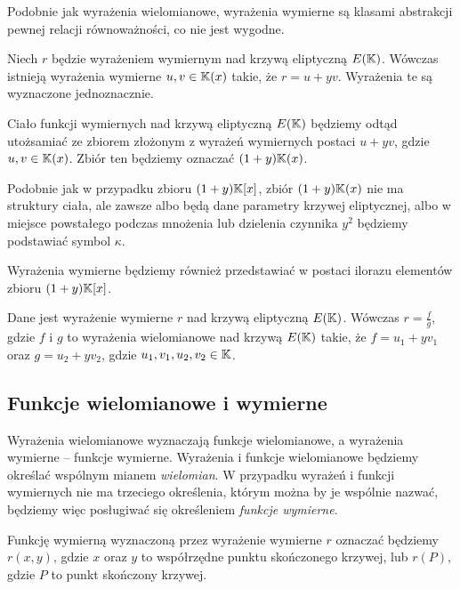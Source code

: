 Podobnie jak wyrażenia wielomianowe,
wyrażenia wymierne są klasami abstrakcji pewnej relacji równoważności,
co nie jest wygodne.

\begin{theorem}
Niech $r$ będzie wyrażeniem wymiernym nad krzywą eliptyczną $E(\mathbb{K})$.
Wówczas istnieją wyrażenia wymierne $u, v \in \mathbb{K}(x)$ takie,
że $r = u + yv$.
Wyrażenia te są wyznaczone jednoznacznie.
\end{theorem}

\begin{remark}
Ciało funkcji wymiernych nad krzywą eliptyczną $E(\mathbb{K})$
będziemy odtąd utożsamiać ze zbiorem
złożonym z wyrażeń wymiernych postaci $u + yv$,
gdzie $u,v \in \mathbb{K}(x)$.
Zbiór ten będziemy oznaczać $(1 + y)\mathbb{K}(x)$.
\end{remark}

Podobnie jak w przypadku zbioru $(1 + y)\mathbb{K}[x]$,
zbiór $(1 + y)\mathbb{K}(x)$ nie ma struktury ciała,
ale zawsze albo będą dane parametry krzywej eliptycznej,
albo w miejsce powstałego podczas mnożenia lub dzielenia czynnika $y^2$
będziemy podstawiać symbol $\kappa$.

Wyrażenia wymierne będziemy również przedstawiać w postaci ilorazu
elementów zbioru $(1 + y)\mathbb{K}[x]$.

\begin{theorem}
Dane jest wyrażenie wymierne $r$ nad krzywą eliptyczną $E(\mathbb{K})$.
Wówczas $r = \frac{f}{g}$,
gdzie $f$ i $g$ to wyrażenia wielomianowe nad krzywą $E(\mathbb{K})$ takie,
że $f = u_1 + yv_1$ oraz $g = u_2 + yv_2$,
gdzie $u_1, v_1, u_2, v_2 \in \mathbb{K}$.
\end{theorem}

\subsection*{Funkcje wielomianowe i wymierne}

Wyrażenia wielomianowe wyznaczają funkcje wielomianowe,
a wyrażenia wymierne -- funkcje wymierne.
Wyrażenia i funkcje wielomianowe będziemy określać
wspólnym mianem \emph{wielomian}.
W przypadku wyrażeń i funkcji wymiernych nie ma trzeciego określenia,
którym można by je wspólnie nazwać,
będziemy więc posługiwać się określeniem \emph{funkcje wymierne}.

\begin{remark}
Funkcję wymierną wyznaczoną przez wyrażenie wymierne $r$
oznaczać będziemy $r(x, y)$,
gdzie $x$ oraz $y$ to współrzędne punktu skończonego krzywej,
lub $r(P)$, gdzie $P$ to punkt skończony krzywej.
\end{remark}

